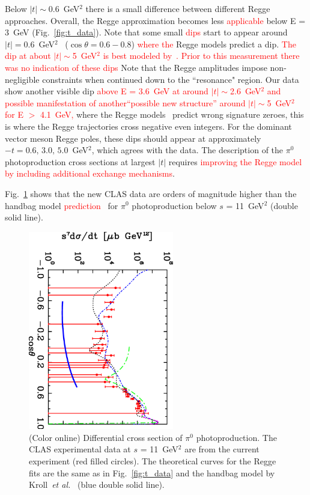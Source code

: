 \documentclass[aps,prc,twocolumn,floatfix,showpacs,preprintnumbers,amsmath,amssymb,superscriptaddress,linenumbers]{revtex4-1}
\begin{document}
Below $|t|\sim$0.6~GeV$^2$ there is a small difference between 
different Regge approaches.  Overall, the Regge approximation 
becomes less \textcolor{red}{applicable} below E = 3~GeV (Fig.~\ref{fig:t_data}).  
Note that some small \textcolor{red}{dips} start to appear around $|t| = 0.6$~GeV$^2$
~($\cos\theta = 0.6-0.8$) \textcolor{red}{where the} Regge models predict a dip.  
\textcolor{red}{The dip at about $|t|\sim$5~GeV$^2$ is best modeled by~\cite{Mathieu:2015eia}. Prior to this measurement there was no indication of these dips}
Note that the Regge amplitudes impose non-negligible constraints when continued down to the 
``resonance" region.
Our data show another visible dip \textcolor{red}{above E = 3.6~GeV at around $|t|\sim$2.6~GeV$^2$ and possible manifestation of another``possible new structure'' around $|t|\sim$5~GeV$^2$ for E $>$ 4.1~GeV,} where the Regge models~\cite{Goldstein:1973xn,
Laget:2005be,Donnachie:2015jaa} predict wrong signature zeroes, 
this is where the Regge trajectories cross negative even integers. 
For the dominant vector meson Regge poles, these dips should appear 
at approximately $-t=0.6, \, 3.0, \, 5.0$~GeV$^2$,  which agrees 
with the data.  The description of the $\pi^0$ photoproduction 
cross sections at largest $|t|$ requires \textcolor{red}{improving the 
Regge model by including additional exchange mechanisms}.

Fig.~\ref{fig:kroll} shows that the new CLAS data are orders of 
magnitude higher than the handbag model \textcolor{red}{prediction}~\cite{Huang:2000kd} for $\pi^0$ 
photoproduction below $s$ = 11~GeV$^2$ (double 
solid line).
\begin{figure}
\centerline{
        \includegraphics[width=2.5in, angle=90]{kroll.eps}}

        \caption {(Color online) Differential cross section 
	of $\pi^0$ photoproduction. The CLAS experimental data 
	at $s$ = 11~GeV$^2$ are from the current experiment (red 
	filled circles). The theoretical curves for the Regge 
	fits are the same as in Fig.~\protect\ref{fig:t_data} 
	and the handbag model by Kroll~\textit{et 
	al.}~\protect\cite{Huang:2000kd} (blue double solid 
	line).} \label{fig:kroll}
\end{figure}
\end{document}
